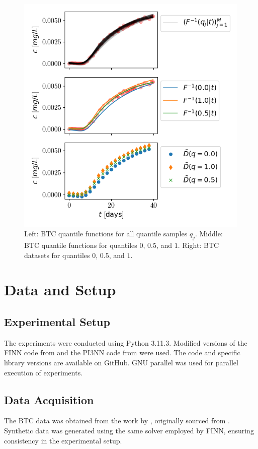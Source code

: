 \begin{figure}[h]
    \centering
    \includegraphics{figs/btc_dataspan_quantiles.png}
    \caption{Left: BTC quantile functions for all quantile samples $q_j$. Middle: BTC quantile functions for quantiles $0$, $0.5$, and $1$. Right: BTC datasets for quantiles $0$, $0.5$, and $1$.}
    \label{fig:btc_dataspan_quantiles}
\end{figure}



\section{Data and Setup}

\subsection{Experimental Setup}
The experiments were conducted using Python 3.11.3. Modified versions of the FINN code from \cite{finn} and the PI3NN code from \cite{pi3nn} were used. The code and specific library versions are available on GitHub. GNU parallel \cite{tange_2023_10199085} was used for parallel execution of experiments. %

\subsection{Data Acquisition}
The BTC data was obtained from the work by \cite{finn}, originally sourced from \cite{nowak2016entropy}. Synthetic data was generated using the same solver employed by FINN, ensuring consistency in the experimental setup.

